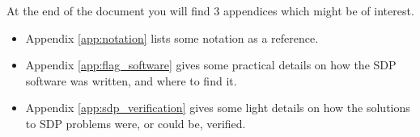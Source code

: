 At the end of the document you will find 3 appendices which might be of interest.
\begin{itemize}
    \item Appendix \ref{app:notation} lists some notation as a reference.
    \item Appendix \ref{app:flag_software} gives some practical details on how the SDP
        software was written, and where to find it.
    \item Appendix \ref{app:sdp_verification} gives some light details on how the solutions
        to SDP problems were, or could be, verified.
\end{itemize}
